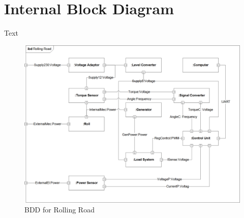\section{Internal Block Diagram}
Text

\begin{figure}[H]
	\centering
	\includegraphics[width=1\linewidth]{Architecture/Diagrams/IBD_RR}
	\caption{BDD for Rolling Road}
	\label{fig:RR_BDD}
\end{figure}